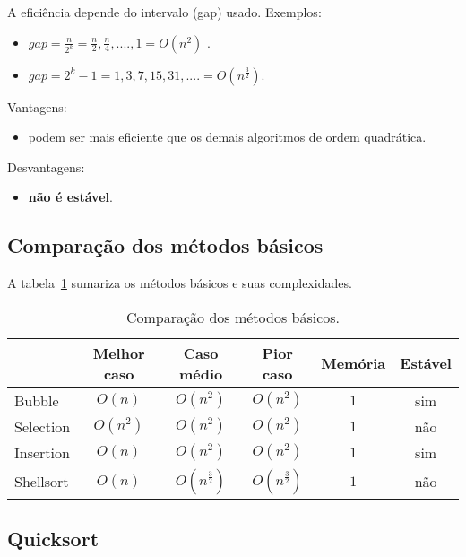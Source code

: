 
A eficiência depende do intervalo (gap) usado. Exemplos:
\begin{itemize}
\item $gap = \frac{n}{2^k} = \frac{n}{2}, \frac{n}{4}, ...., 1 = O(n^2)$ .
\item $gap = 2^k - 1 = 1,3,7,15,31,.... = O(n^{\frac{3}{2}})$.
\end{itemize}

Vantagens:
\begin{itemize}
\item podem ser mais eficiente que os demais algoritmos de ordem quadrática.
\end{itemize}
Desvantagens:
\begin{itemize}
\item {\bf não é estável}.
\end{itemize}


\subsection{Comparação dos métodos básicos}

A tabela~\ref{aula03:tab:caso01} sumariza os métodos básicos e suas complexidades.
%
\begin{table}[!ht]
\centering
\begin{tabular}{lccccc}
\hline
          & Melhor caso & Caso médio & Pior caso & Memória & Estável \\ \hline
Bubble    & $O(n)$ & $O(n^2)$ & $O(n^2)$ & $1$ & sim \\ \hline
Selection & $O(n^2)$ & $O(n^2)$ & $O(n^2)$ & $1$ & não  \\ \hline
Insertion & $O(n)$ & $O(n^2)$ & $O(n^2)$ & $1$ &  sim \\ \hline
Shellsort & $O(n)$ & $O(n^{\frac{3}{2}})$ & $O(n^{\frac{3}{2}})$ &  $1$ & não \\ \hline
\end{tabular}
\caption{Comparação dos métodos básicos.}
\label{aula03:tab:caso01}
\end{table}

\subsection{Quicksort}


